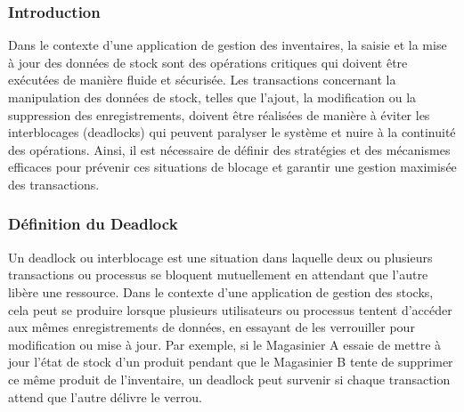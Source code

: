 \documentclass[a4paper, oneside, 12pt, final]{extreport}
\begin{document}
\subsubsection{Introduction}
Dans le contexte d'une application de gestion des inventaires, la saisie et la mise à jour des données de stock sont des opérations critiques qui doivent être exécutées de manière fluide et sécurisée. Les transactions concernant la manipulation des données de stock, telles que l'ajout, la modification ou la suppression des enregistrements, doivent être réalisées de manière à éviter les interblocages (deadlocks) qui peuvent paralyser le système et nuire à la continuité des opérations. Ainsi, il est nécessaire de définir des stratégies et des mécanismes efficaces pour prévenir ces situations de blocage et garantir une gestion maximisée des transactions.

\subsubsection{Définition du Deadlock}
Un deadlock ou interblocage est une situation dans laquelle deux ou plusieurs transactions ou processus se bloquent mutuellement en attendant que l'autre libère une ressource. Dans le contexte d'une application de gestion des stocks, cela peut se produire lorsque plusieurs utilisateurs ou processus tentent d'accéder aux mêmes enregistrements de données, en essayant de les verrouiller pour modification ou mise à jour. Par exemple, si le Magasinier A essaie de mettre à jour l'état de stock d'un produit pendant que le Magasinier B tente de supprimer ce même produit de l'inventaire, un deadlock peut survenir si chaque transaction attend que l'autre délivre le verrou.
\end{document}
